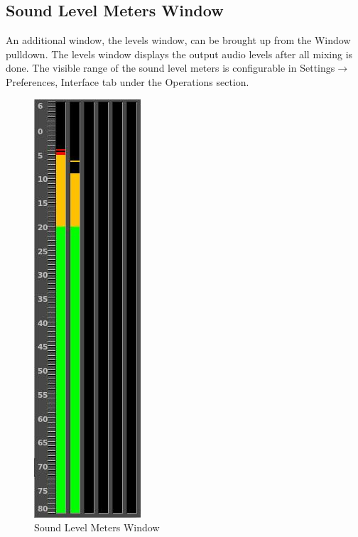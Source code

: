 \subsection{Sound Level Meters Window}%
\label{sub:sound_level_meters_window}

An additional window, the levels window, can be brought up from the Window pulldown.  
The levels window displays the output audio levels after all mixing is done.  
The visible range of the sound level meters is configurable in Settings$\rightarrow$Preferences, Interface tab under the Operations section.

\begin{figure} 
    \centering
    \includegraphics[width=0.5\linewidth]{images/volume_meter.png}
    \caption{Sound Level Meters Window}
    \label{fig:volume_meter}
\end{figure}

